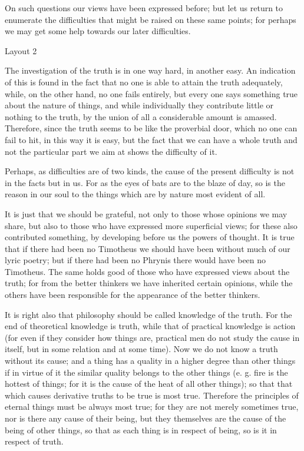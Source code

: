 On such questions our views have been expressed before; but let us return to enumerate the difficulties that might be raised on these same points; for perhaps we may get some help towards our later difficulties.


Layout 2


The investigation of the truth is in one way hard, in another easy. An indication of this is found in the fact that no one is able to attain the truth adequately, while, on the other hand, no one fails entirely, but every one says something true about the nature of things, and while individually they contribute little or nothing to the truth, by the union of all a considerable amount is amassed. Therefore, since the truth seems to be like the proverbial door, which no one can fail to hit, in this way it is easy, but the fact that we can have a whole truth and not the particular part we aim at shows the difficulty of it.

Perhaps, as difficulties are of two kinds, the cause of the present difficulty is not in the facts but in us. For as the eyes of bats are to the blaze of day, so is the reason in our soul to the things which are by nature most evident of all.

It is just that we should be grateful, not only to those whose opinions we may share, but also to those who have expressed more superficial views; for these also contributed something, by developing before us the powers of thought. It is true that if there had been no Timotheus we should have been without much of our lyric poetry; but if there had been no Phrynis there would have been no Timotheus. The same holds good of those who have expressed views about the truth; for from the better thinkers we have inherited certain opinions, while the others have been responsible for the appearance of the better thinkers.

It is right also that philosophy should be called knowledge of the truth. For the end of theoretical knowledge is truth, while that of practical knowledge is action (for even if they consider how things are, practical men do not study the cause in itself, but in some relation and at some time). Now we do not know a truth without its cause; and a thing has a quality in a higher degree than other things if in virtue of it the similar quality belongs to the other things (e. g. fire is the hottest of things; for it is the cause of the heat of all other things); so that that which causes derivative truths to be true is most true. Therefore the principles of eternal things must be always most true; for they are not merely sometimes true, nor is there any cause of their being, but they themselves are the cause of the being of other things, so that as each thing is in respect of being, so is it in respect of truth.

